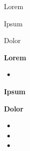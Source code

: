 \documentclass[11pt,twoside]{mins}
\begin{document}
\begin{minutes}

\begin{announcements}

\item 
Lorem

\item
Ipsum

\item
Dolor

\end{announcements}

\begin{business}

\item 
\textbf{Lorem}\\
\lipsum[1]

\begin{itemize}
\item
\lipsum[2]
\end{itemize}


\item
\textbf{Ipsum}\\
\lipsum[3]


\item
\textbf{Dolor}\\
\lipsum[4]

\begin{itemize}
\item
\lipsum[5]

\item
\lipsum[6]

\item
\lipsum[7]
\end{itemize}

\end{business}

%

\end{minutes}
\end{document}
